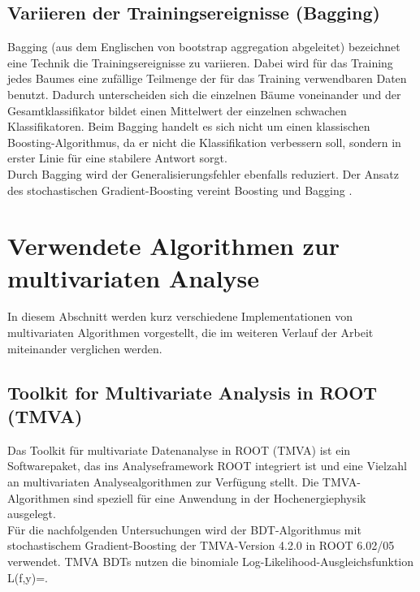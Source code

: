 \subsection{Variieren der Trainingsereignisse (Bagging)}
\label{ch:Algorithmen:subsec:Bagging}

Bagging (aus dem Englischen von bootstrap aggregation abgeleitet) bezeichnet eine Technik die Trainingsereignisse zu variieren. Dabei wird f\"ur das Training jedes Baumes eine zuf\"allige Teilmenge der f\"ur das Training verwendbaren Daten benutzt. Dadurch unterscheiden sich die einzelnen B\"aume voneinander und der Gesamtklassifikator bildet einen Mittelwert der einzelnen schwachen Klassifikatoren.
Beim Bagging handelt es sich nicht um einen klassischen Boosting-Algorithmus, da er nicht die Klassifikation verbessern soll, sondern in erster Linie f\"ur eine stabilere Antwort sorgt.\\
Durch Bagging wird der Generalisierungsfehler ebenfalls reduziert.
Der Ansatz des stochastischen Gradient-Boosting vereint Boosting und Bagging \cite{Friedman:2002:SGB:635939.635941}.


\section{Verwendete Algorithmen zur multivariaten Analyse}
\label{ch:Algorithmen:subsec:Implementationen}

In diesem Abschnitt werden kurz verschiedene Implementationen von multivariaten Algorithmen vorgestellt, die im weiteren Verlauf der Arbeit miteinander verglichen werden.

\subsection{Toolkit for Multivariate Analysis in ROOT (TMVA)}
\label{ch:Algorithmen:subsec:TMVA}

Das Toolkit f\"ur multivariate Datenanalyse in ROOT (TMVA) \cite{Hocker:2007ht} ist ein Softwarepaket, das ins Analyseframework ROOT \cite{ROOT} integriert ist und eine Vielzahl an multivariaten Analysealgorithmen zur Verf\"ugung stellt. Die TMVA-Algorithmen sind speziell f\"ur eine Anwendung in der Hochenergiephysik ausgelegt.\\
F\"ur die nachfolgenden Untersuchungen wird der BDT-Algorithmus mit stochastischem Gradient-Boosting der TMVA-Version 4.2.0 in ROOT 6.02/05 verwendet. TMVA BDTs nutzen die binomiale Log-Likelihood-Ausgleichsfunktion
\beq
L(f,y)=.
\label{eq:tmva_loss}
\eeq


